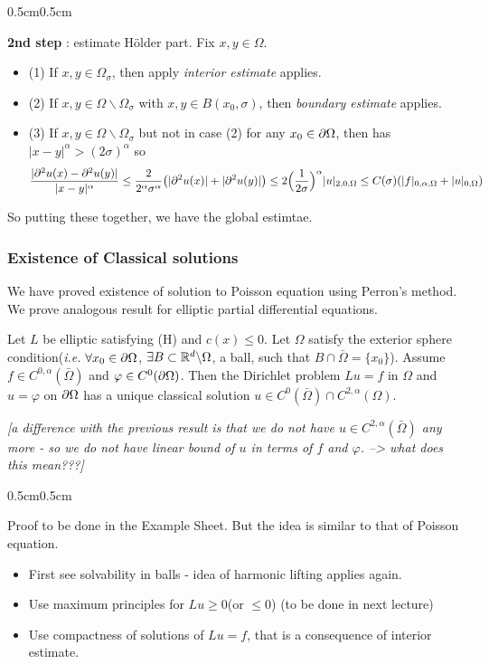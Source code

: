 \documentclass[12pt,a4paper]{article}
\newenvironment{proof}
{\begin{changemargin}{0.5cm}{0.5cm} 
	}%
	{\end{changemargin}
}
\renewenvironment{i}
{\begin{itemize} 
	}%
	{\end{itemize}
}
\newenvironment{p}
{\begin{proof} 
	}%
	{\end{proof}
}
\begin{document}
\begin{p}
\textbf{2nd step} : estimate H\"older part. Fix $x,y\in \Omega$.
\begin{i}
\item[(1)] If $x, y\in \Omega_{\sigma}$, then apply \emph{interior estimate} applies.
\item[(2)] If $x, y\in \Omega \backslash \Omega_{\sigma}$ with $x, y\in B(x_0, \sigma)$, then \emph{boundary estimate} applies.
\item[(3)] If $x, y\in \Omega \backslash \Omega_{\sigma}$ but not in case (2) for any $x_0 \in \partial \Omega$, then has $|x-y|^{\alpha} > (2 \sigma)^{\alpha}$ so
\begin{align*}
\frac{|\partial^2 u(x) - \partial^2 u(y)|}{|x-y|^{\alpha}} \leq \frac{2}{2^{\alpha}\sigma^{\alpha}} \big(|\partial^2 u(x)| + |\partial^2 u(y)| \big) \leq 2\Big(\frac{1}{2\sigma} \Big)^{\alpha} |u|_{2, 0, \Omega} \leq C(\sigma)(|f|_{0, \alpha, \Omega} + |u|_{0, \Omega})
\end{align*}
\end{i}
So putting these together, we have the global estimtae.

\eop
\end{p}
\s

\subsubsection*{Existence of Classical solutions}

We have proved existence of solution to Poisson equation using Perron's method. We prove analogous result for elliptic partial differential equations.
\s

\thm Let $L$ be elliptic satisfying (H) and $c(x) \leq 0$. Let $\Omega$ satisfy the exterior sphere condition(\textit{i.e.} $\forall x_0 \in \partial \Omega$, $\exists B \subset \mathbb{R}^d \backslash \Omega$, a ball, such that $B\cap \bar{\Omega} = \{x_0 \}$). Assume $f\in C^{0, \alpha}(\bar{\Omega})$ and $\varphi \in C^0(\partial \Omega)$. Then the Dirichlet problem $Lu =f$ in $\Omega$ and $u= \varphi$ on $\partial \Omega$ has a unique classical solution $u\in C^0(\bar{\Omega}) \cap C^{2, \alpha}(\Omega)$.

\emph{[a difference with the previous result is that we do not have $u \in C^{2, \alpha}(\bar{\Omega})$ any more - so we do not have linear bound of $u$ in terms of $f$ and $\varphi$. --> what does this mean???]}
\begin{p}
\pf Proof to be done in the Example Sheet. But the idea is similar to that of Poisson equation.
\begin{i}
\item First see solvability in balls - idea of harmonic lifting applies again. 
\item Use maximum principles for $Lu \geq 0$(or $\leq 0$) (to be done in next lecture)
\item Use compactness of solutions of $Lu =f$, that is a consequence of interior estimate.
\end{i} 
\end{p}
\s
\end{document}
